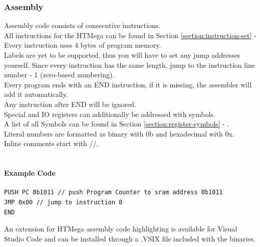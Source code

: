 \subsubsection{Assembly}
Assembly code consists of consecutive instructions. \\
All instructions for the HTMega can be found in Section \ref{section:instruction-set} -  \\

Every instruction uses 4 bytes of program memory. \\
Labels are yet to be supported, thus you will have to set any jump addresses yourself. Since every instruction has the same length, jump to the instruction line number - 1 (zero-based numbering). \\

Every program ends with an END instruction, if it is missing, the assembler will add it automatically. \\
Any instruction after END will be ignored. \\

Special and IO registers can additionally be addressed with symbols.\\
A list of all Symbols can be found in Section \ref{section:register-symbols} - .\\
Literal numbers are formatted as binary with 0b and hexadecimal with 0x.\\
Inline comments start with //.\\ ~\\

\paragraph{Example Code}
\begin{mdframed}[backgroundcolor=light-gray, roundcorner=10pt,leftmargin=1, rightmargin=1, innerleftmargin=15, innertopmargin=6,innerbottommargin=6, outerlinewidth=1, linecolor=light-gray]
\begin{lstlisting}[style=hasm]
PUSH PC 0b1011 // push Program Counter to sram address 0b1011 
JMP 0x00 // jump to instruction 0 
END
\end{lstlisting}
\end{mdframed}
An extension for HTMega assembly code highlighting is available for Visual Studio Code and can be installed through a .VSIX file included with the binaries.

